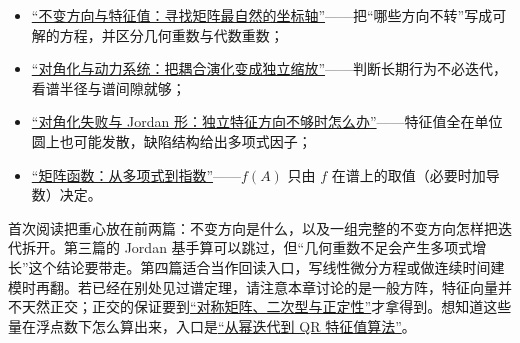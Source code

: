 \begin{itemize}
\tightlist
\item \hyperref[sec:03-Linear-Algebra/05-Eigenvalues-and-Eigenvectors/01]{``不变方向与特征值：寻找矩阵最自然的坐标轴''}——把``哪些方向不转''写成可解的方程，并区分几何重数与代数重数；
\item \hyperref[sec:03-Linear-Algebra/05-Eigenvalues-and-Eigenvectors/02]{``对角化与动力系统：把耦合演化变成独立缩放''}——判断长期行为不必迭代，看谱半径与谱间隙就够；
\item \hyperref[sec:03-Linear-Algebra/05-Eigenvalues-and-Eigenvectors/03]{``对角化失败与 Jordan 形：独立特征方向不够时怎么办''}——特征值全在单位圆上也可能发散，缺陷结构给出多项式因子；
\item \hyperref[sec:03-Linear-Algebra/05-Eigenvalues-and-Eigenvectors/04]{``矩阵函数：从多项式到指数''}——\(f(A)\) 只由 \(f\) 在谱上的取值（必要时加导数）决定。
\end{itemize}

首次阅读把重心放在前两篇：不变方向是什么，以及一组完整的不变方向怎样把迭代拆开。第三篇的 Jordan 基手算可以跳过，但``几何重数不足会产生多项式增长''这个结论要带走。第四篇适合当作回读入口，写线性微分方程或做连续时间建模时再翻。若已经在别处见过谱定理，请注意本章讨论的是一般方阵，特征向量并不天然正交；正交的保证要到\hyperref[ch:021]{``对称矩阵、二次型与正定性''}才拿得到。想知道这些量在浮点数下怎么算出来，入口是\hyperref[sec:08-Numerical-Analysis/05-Numerical-Linear-Algebra/05]{``从幂迭代到 QR 特征值算法''}。
